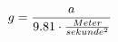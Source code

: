 \documentclass[preview]{standalone}
\begin{document}
\begin{align*}
\special{dvisvgm:raw <g id='unique000'>}g = \frac{a}{9.81 \cdot \frac{Meter}{sekunde^{2}}}\special{dvisvgm:raw </g>}
\end{align*}
\end{document}
